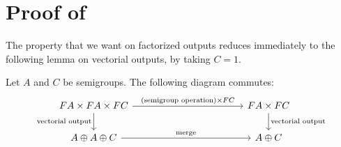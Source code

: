 \section{Proof of }

The property that we want on factorized outputs reduces immediately to the following lemma on vectorial outputs, by taking $C = 1$.

\begin{lemma}\label{lem:merge-middle}
    Let $A$ and $C$ be semigroups. The following diagram commutes:
    \[\begin{tikzcd}
        [column sep=4cm]
        \functor A\times \functor A \times \functor C
        \ar[d,"\text{vectorial output}"']
        \ar[r,"(\text{semigroup operation}) \times \functor C"]
        &
        \functor A \times \functor C
        \ar[d,"\text{vectorial output}"]
        \\
        A \oplus A \oplus C
        \ar[r,"\text{merge}"]
        &
        A \oplus C
    \end{tikzcd}\]
\end{lemma}
